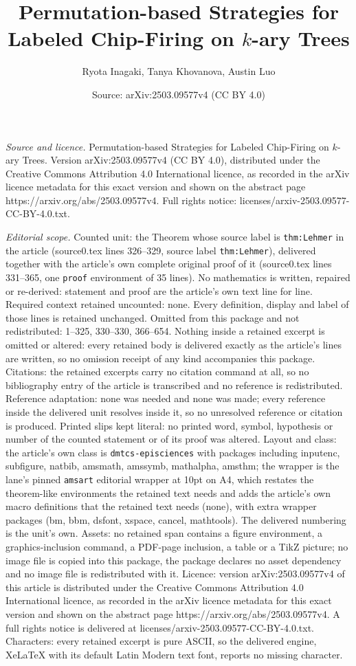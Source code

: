 \documentclass[10pt,a4paper]{amsart}
\title[Permutation-based Strategies for Labeled Chip-Firing on $k$-]{Permutation-based Strategies for Labeled Chip-Firing on $k$-ary Trees}
\author{Ryota Inagaki, Tanya Khovanova, Austin Luo}
\date{Source: arXiv:2503.09577v4 (CC BY 4.0)}
\begin{document}
\maketitle

\noindent\emph{Source and licence.} Permutation-based Strategies for Labeled Chip-Firing on $k$-ary Trees. Version arXiv:2503.09577v4 (CC BY 4.0), distributed under the Creative Commons Attribution 4.0 International licence, as recorded in the arXiv licence metadata for this exact version and shown on the abstract page https://arxiv.org/abs/2503.09577v4. Full rights notice: licenses/arxiv-2503.09577-CC-BY-4.0.txt.\par\smallskip

\noindent\textit{Editorial scope.} Counted unit: the Theorem whose source label is \texttt{thm:Lehmer} in the article (source0.tex lines 326--329, source label \texttt{thm:Lehmer}), delivered together with the article's own complete original proof of it (source0.tex lines 331--365, one \texttt{proof} environment of 35 lines). No mathematics is written, repaired or re-derived: statement and proof are the article's own text line for line. Required context retained uncounted: none. Every definition, display and label of those lines is retained unchanged. Omitted from this package and not redistributed: 1--325, 330--330, 366--654. Nothing inside a retained excerpt is omitted or altered: every retained body is delivered exactly as the article's lines are written, so no omission receipt of any kind accompanies this package. Citations: the retained excerpts carry no citation command at all, so no bibliography entry of the article is transcribed and no reference is redistributed. Reference adaptation: none was needed and none was made; every reference inside the delivered unit resolves inside it, so no unresolved reference or citation is produced. Printed slips kept literal: no printed word, symbol, hypothesis or number of the counted statement or of its proof was altered. Layout and class: the article's own class is \texttt{dmtcs-episciences} with packages including inputenc, subfigure, natbib, amsmath, amssymb, mathalpha, amsthm; the wrapper is the lane's pinned \texttt{amsart} editorial wrapper at 10pt on A4, which restates the theorem-like environments the retained text needs and adds the article's own macro definitions that the retained text needs (none), with extra wrapper packages (bm, bbm, dsfont, xspace, cancel, mathtools). The delivered numbering is the unit's own. Assets: no retained span contains a figure environment, a graphics-inclusion command, a PDF-page inclusion, a table or a TikZ picture; no image file is copied into this package, the package declares no asset dependency and no image file is redistributed with it. Licence: version arXiv:2503.09577v4 of this article is distributed under the Creative Commons Attribution 4.0 International licence, as recorded in the arXiv licence metadata for this exact version and shown on the abstract page https://arxiv.org/abs/2503.09577v4. A full rights notice is delivered at licenses/arxiv-2503.09577-CC-BY-4.0.txt. Characters: every retained excerpt is pure ASCII, so the delivered engine, XeLaTeX with its default Latin Modern text font, reports no missing character.
\end{document}
